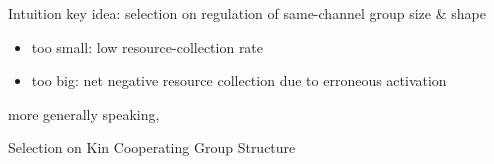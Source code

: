 \begin{frame}{Intuition}
key idea: selection on regulation of same-channel group size \& shape
\begin{itemize}
  \item too small: low resource-collection rate
  \item too big: net negative resource collection due to erroneous activation
\end{itemize}

more generally speaking,

Selection on Kin Cooperating Group Structure

\end{frame}
